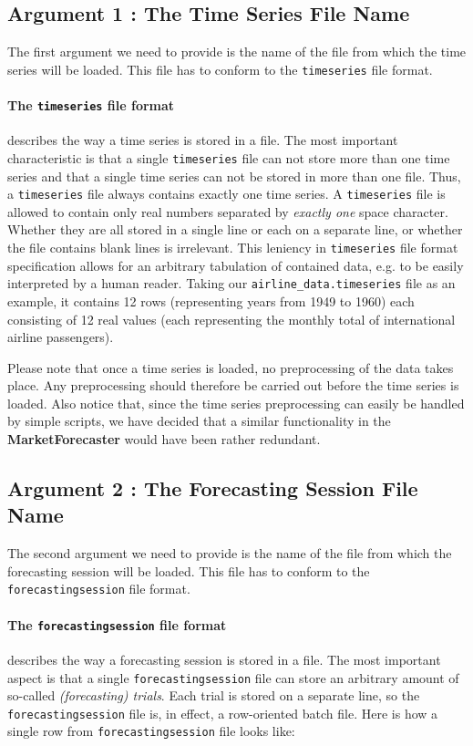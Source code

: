 \subsection{Argument 1 : The Time Series File Name}

The first argument we need to provide is the name of the file from which the time series will be loaded. This file has to conform to the \texttt{timeseries} file format.

\paragraph{The \texttt{timeseries} file format} describes the way a time series is stored in a file. The most important characteristic is that a single \texttt{timeseries} file can not store more than one time series and that a single time series can not be stored in more than one file. Thus, a \texttt{timeseries} file always contains exactly one time series. A \texttt{timeseries} file is allowed to contain only real numbers separated by \textit{exactly one} space character. Whether they are all stored in a single line or each on a separate line, or whether the file contains blank lines is irrelevant. This leniency in \texttt{timeseries} file format specification allows for an arbitrary tabulation of contained data, e.g. to be easily interpreted by a human reader. Taking our \texttt{airline\_data.timeseries} file as an example, it contains 12 rows (representing years from 1949 to 1960) each consisting of 12 real values (each representing the monthly total of international airline passengers).

Please note that once a time series is loaded, no preprocessing of the data takes place. Any preprocessing should therefore be carried out before the time series is loaded. Also notice that, since the time series preprocessing can easily be handled by simple scripts, we have decided that a similar functionality in the \textbf{MarketForecaster} would have been rather redundant. 

\subsection{Argument 2 : The Forecasting Session File Name}

The second argument we need to provide is the name of the file from which the forecasting session will be loaded. This file has to conform to the \texttt{forecastingsession} file format.

\paragraph{The \texttt{forecastingsession} file format} describes the way a forecasting session is stored in a file. The most important aspect is that a single \texttt{forecastingsession} file can store an arbitrary amount of so-called \textit{(forecasting) trials}. Each trial is stored on a separate line, so the\\ \texttt{forecastingsession} file is, in effect, a row-oriented batch file. Here is how a single row from \texttt{forecastingsession} file looks like:

